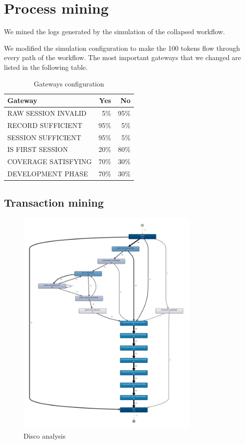 \section{Process mining}
\label{sec:process_mining}

We mined the logs generated by the simulation of the collapsed workflow.

We modified the simulation configuration to make the 100 tokens
flow through every path of the workflow. The most important gateways that we
changed are listed in the following table.
\begin{table}[H]
\centering
\begin{tabular}{|l|r|r|}
\hline
\textbf{Gateway} & \textbf{Yes} & \textbf{No} \\
\hline
RAW SESSION INVALID & 5\% & 95\% \\
\hline
RECORD SUFFICIENT & 95\% & 5\% \\
\hline
SESSION SUFFICIENT & 95\% & 5\% \\
\hline
IS FIRST SESSION & 20\% & 80\% \\
\hline
COVERAGE SATISFYING & 70\% & 30\% \\
\hline
DEVELOPMENT PHASE & 70\% & 30\% \\
\hline
\end{tabular}
\caption{Gateways configuration}
\label{tab:gateways_configuration}
\end{table}

\subsection{Transaction mining}

\begin{figure}[H]
\centering
\includegraphics[width=0.8\textwidth]{figures/disco_map.pdf}
\caption{Disco analysis}
\label{fig:disco_analysis}
\end{figure}

